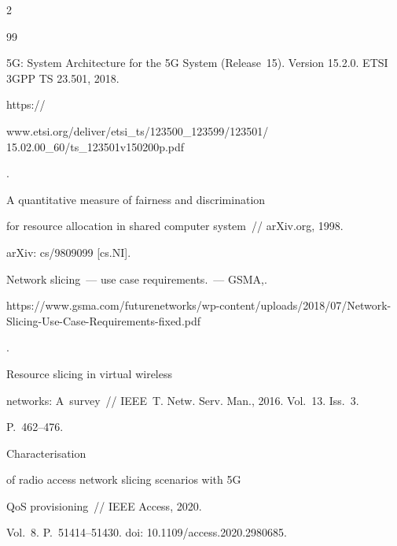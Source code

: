 \begin{multicols}{2}
{{\begin{thebibliography}{99}


5G: System Architecture for the 5G System (Release~15). Version 15.2.0. ETSI 3GPP TS 23.501, 2018. 


{\sf https://\linebreak


www.etsi.org/deliver/etsi\_ts/123500\_123599/123501/ 15.02.00\_60/ts\_123501v150200p.pdf}. 







 A quantitative measure of fairness and discrimination 


for resource allocation in shared computer system~// arXiv.org, 1998. 


\mbox{arXiv}: cs/9809099 [cs.NI].







Network slicing~--- use case requirements.~--- \mbox{GSMA},. {\sf  


https://www.gsma.com/futurenetworks/wp-content/uploads/2018/07/Network-Slicing-Use-Case-Requirements-fixed.pdf}.







 Resource slicing in virtual wireless 


networks: A~survey~// IEEE~T. Netw. Serv. Man., 2016. Vol.~13. Iss.~3.  


P.~462--476.




 Characterisation 


of radio access network slicing scenarios with 5G\linebreak


\vspace*{-12pt}


\pagebreak





\noindent


QoS provisioning~// IEEE Access, 2020. 


Vol.~8. P.~51414--51430. doi: 10.1109/access.2020.2980685.



\end{thebibliography}}}
\end{multicols}
